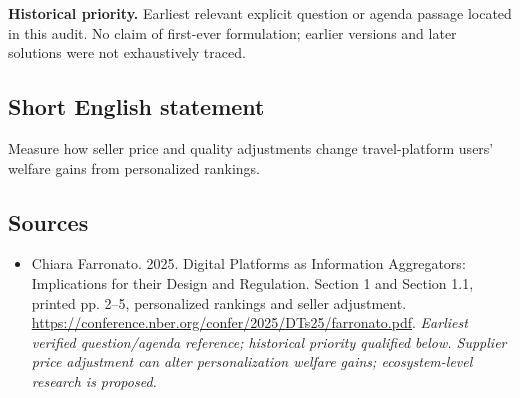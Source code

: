 \documentclass[11pt]{article}
\begin{document}
\par\textbf{Historical priority.} Earliest relevant explicit question or agenda passage located in this audit. No claim of first-ever formulation; earlier versions and later solutions were not exhaustively traced.

\subsection{Short English statement}
Measure how seller price and quality adjustments change travel-platform users' welfare gains from personalized rankings.

\subsection{Sources}
\begin{itemize}\raggedright
\item[\textnormal{[S1]}]\hypertarget{source:30007682:1}{} Chiara Farronato. 2025. Digital Platforms as Information Aggregators: Implications for their Design and Regulation. Section 1 and Section 1.1, printed pp. 2–5, personalized rankings and seller adjustment.
\url{https://conference.nber.org/confer/2025/DTs25/farronato.pdf}.
{\small\textit{Earliest verified question/agenda reference; historical priority qualified below. Supplier price adjustment can alter personalization welfare gains; ecosystem-level research is proposed.}}
\end{itemize}
\end{document}
